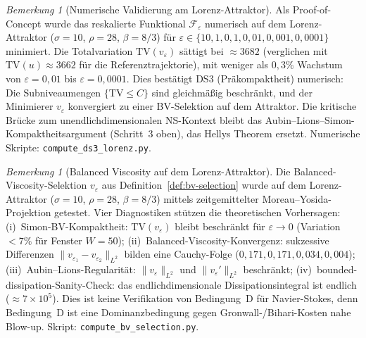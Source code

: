 \documentclass[12pt,a4paper]{article}
\theoremstyle{definition}
\theoremstyle{plain}
\theoremstyle{remark}
\newtheorem{remark}[definition]{Bemerkung}
\begin{document}
\begin{remark}[Numerische Validierung am Lorenz-Attraktor]\label{rem:ds3-lorenz}
Als Proof-of-Concept wurde das reskalierte Funktional $\mathcal{F}_\varepsilon$ numerisch auf dem Lorenz-Attraktor ($\sigma = 10$, $\rho = 28$, $\beta = 8/3$) für $\varepsilon \in \{10, 1, 0{,}1, 0{,}01, 0{,}001, 0{,}0001\}$ minimiert. Die Totalvariation $\mathrm{TV}(v_\varepsilon)$ sättigt bei $\approx 3682$ (verglichen mit $\mathrm{TV}(u) \approx 3662$ für die Referenztrajektorie), mit weniger als $0{,}3\%$ Wachstum von $\varepsilon = 0{,}01$ bis $\varepsilon = 0{,}0001$. Dies bestätigt DS3 (Präkompaktheit) numerisch: Die Subniveaumengen $\{\mathrm{TV} \leq C\}$ sind gleichmäßig beschränkt, und der Minimierer $v_\varepsilon$ konvergiert zu einer BV-Selektion auf dem Attraktor. Die kritische Brücke zum unendlichdimensionalen NS-Kontext bleibt das Aubin--Lions--Simon-Kompaktheitsargument (Schritt~3 oben), das Hellys Theorem ersetzt. Numerische Skripte: \texttt{compute\_ds3\_lorenz.py}.
\end{remark}

\begin{remark}[Balanced Viscosity auf dem Lorenz-Attraktor]
\label{rem:bv-lorenz}
Die Balanced-Viscosity-Selektion $v_\varepsilon$ aus Definition~\ref{def:bv-selection} wurde auf dem Lorenz-Attraktor ($\sigma=10$, $\rho=28$, $\beta=8/3$) mittels zeitgemittelter Moreau--Yosida-Projektion getestet. Vier Diagnostiken stützen die theoretischen Vorhersagen: (i)~Simon-BV-Kompaktheit: $\mathrm{TV}(v_\varepsilon)$ bleibt beschränkt für $\varepsilon \to 0$ (Variation $< 7\%$ für Fenster $W=50$); (ii)~Balanced-Viscosity-Konvergenz: sukzessive Differenzen $\|v_{\varepsilon_1} - v_{\varepsilon_2}\|_{L^2}$ bilden eine Cauchy-Folge ($0{,}171, 0{,}171, 0{,}034, 0{,}004$); (iii)~Aubin--Lions-Regularität: $\|v_\varepsilon\|_{L^2}$ und $\|v_\varepsilon'\|_{L^2}$ beschränkt; (iv)~bounded-dissipation-Sanity-Check: das endlichdimensionale Dissipationsintegral ist endlich ($\approx 7 \times 10^5$). Dies ist keine Verifikation von Bedingung~D für Navier-Stokes, denn Bedingung~D ist eine Dominanzbedingung gegen Gronwall-/Bihari-Kosten nahe Blow-up. Skript: \texttt{compute\_bv\_selection.py}.
\end{remark}
\end{document}
